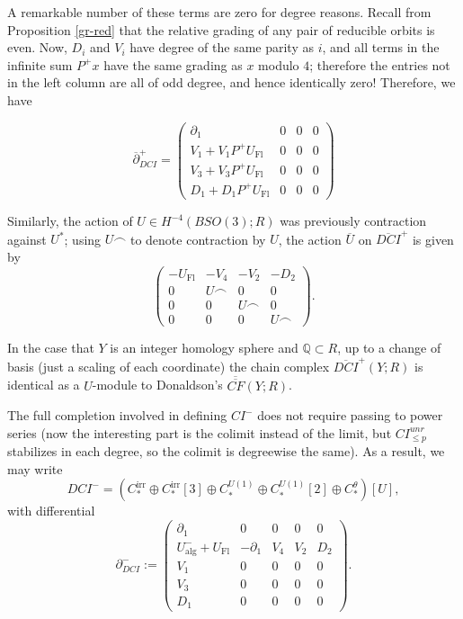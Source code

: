 \documentclass{memo-l}
\theoremstyle{definition}
\theoremstyle{remark}
\numberwithin{section}{chapter}
\numberwithin{equation}{chapter}
\begin{document}
A remarkable number of these terms are zero for degree reasons. Recall from Proposition \ref{gr-red} that the relative grading of any pair of reducible orbits is even. Now, $D_i$ and $V_i$ have degree of the same parity as $i$, and all terms in the infinite sum $P^+x$ have the same grading as $x$ modulo $4$; therefore the entries not in the left column are all of odd degree, and hence identically zero! Therefore, we have 

$$\overline{\partial}_{DCI}^+ = \begin{pmatrix}\partial_1 & 0 & 0 & 0 \\ 
V_1 + V_1P^+U_{\text{Fl}} & 0 & 0 & 0 \\ 
V_3 + V_3P^+U_{\text{Fl}} & 0 & 0 & 0 \\ 
D_1 + D_1P^+U_{\text{Fl}} & 0 & 0 & 0\end{pmatrix}$$

Similarly, the action of $U \in H^{-4}(BSO(3);R)$ was previously contraction against $U^*$; using $U \frown$ to denote contraction by $U$, the action $\overline U$ on $\overline{DCI}^+$ is given by $$\begin{pmatrix}-U_{\text{Fl}} & -V_4 & -V_2 & -D_2 \\ 0 & U \frown & 0 & 0\\ 0 & 0 & U \frown & 0 \\ 0 & 0 & 0 & U \frown \end{pmatrix}.$$

In the case that $Y$ is an integer homology sphere and $\mathbb Q \subset R$, up to a change of basis (just a scaling of each coordinate) the chain complex $\overline{DCI}^+(Y;R)$ is identical as a $U$-module to Donaldson's $\overline{\overline{CF}}(Y;R)$.

The full completion involved in defining $CI^-$ does not require passing to power series (now the interesting part is the colimit instead of the limit, but $CI^{unr}_{\le p}$ stabilizes in each degree, so the colimit is degreewise the same). As a result, we may write $$DCI^- = \left(C_*^\text{irr} \oplus C_*^\text{irr}[3] \oplus C_*^{U(1)} \oplus C_*^{U(1)}[2] \oplus C_*^\theta\right)[U],$$ with differential 
$$\partial_{DCI}^- := \begin{pmatrix}\partial_1 & 0 & 0 & 0 & 0\\
U^-_{\text{alg}} + U_{\text{Fl}} & -\partial_1 & V_4 & V_2 & D_2 \\ 
V_1 & 0 & 0 & 0 & 0\\ 
V_3 & 0 & 0 & 0 & 0\\ 
D_1 & 0 & 0 & 0 & 0\end{pmatrix}.$$ 
\end{document}
